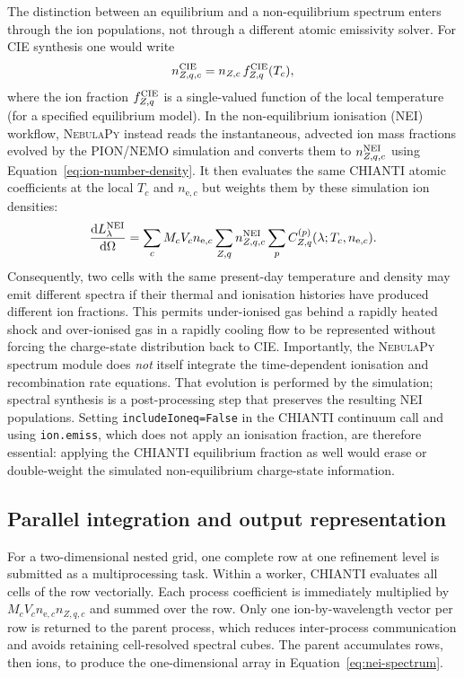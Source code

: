 The distinction between an equilibrium and a non-equilibrium spectrum enters
through the ion populations, not through a different atomic emissivity solver.
For CIE synthesis one would write
\begin{equation}
  n^{\rm CIE}_{Z,q,c}
  = n_{Z,c}\,f^{\rm CIE}_{Z,q}(T_c),
\end{equation}
where the ion fraction $f^{\rm CIE}_{Z,q}$ is a single-valued function of the
local temperature (for a specified equilibrium model).  In the non-equilibrium
ionisation (NEI) workflow, \textsc{NebulaPy} instead reads the instantaneous,
advected ion mass fractions evolved by the PION/NEMO simulation and converts
them to $n^{\rm NEI}_{Z,q,c}$ using Equation~\eqref{eq:ion-number-density}.  It
then evaluates the same CHIANTI atomic coefficients at the local $T_c$ and
$n_{\mathrm e,c}$ but weights them by these simulation ion densities:
\begin{equation}
  \frac{\mathrm dL^{\rm NEI}_\lambda}{\mathrm d\Omega}
  = \sum_c M_cV_cn_{\mathrm e,c}
    \sum_{Z,q}n^{\rm NEI}_{Z,q,c}
    \sum_p C^{(p)}_{Z,q}(\lambda;T_c,n_{\mathrm e,c}).
  \label{eq:nei-spectrum}
\end{equation}
Consequently, two cells with the same present-day temperature and density may
emit different spectra if their thermal and ionisation histories have produced
different ion fractions.  This permits under-ionised gas behind a rapidly
heated shock and over-ionised gas in a rapidly cooling flow to be represented
without forcing the charge-state distribution back to CIE.  Importantly, the
\textsc{NebulaPy} spectrum module does \emph{not} itself integrate the
time-dependent ionisation and recombination rate equations.  That evolution is
performed by the simulation; spectral synthesis is a post-processing step that
preserves the resulting NEI populations.  Setting
\texttt{includeIoneq=False} in the CHIANTI continuum call and using
\texttt{ion.emiss}, which does not apply an ionisation fraction, are therefore
essential: applying the CHIANTI equilibrium fraction as well would erase or
double-weight the simulated non-equilibrium charge-state information.

\subsection{Parallel integration and output representation}

For a two-dimensional nested grid, one complete row at one refinement level is
submitted as a multiprocessing task.  Within a worker, CHIANTI evaluates all
cells of the row vectorially.  Each process coefficient is immediately
multiplied by $M_cV_cn_{\mathrm e,c}n_{Z,q,c}$ and summed over the row.  Only
one ion-by-wavelength vector per row is returned to the parent process, which
reduces inter-process communication and avoids retaining cell-resolved spectral
cubes.  The parent accumulates rows, then ions, to produce the one-dimensional
array in Equation~\eqref{eq:nei-spectrum}.

